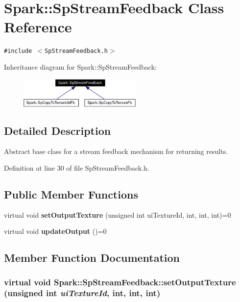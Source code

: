 \section{Spark::Sp\-Stream\-Feedback Class Reference}
\label{classSpark_1_1SpStreamFeedback}
{\tt \#include $<$Sp\-Stream\-Feedback.h$>$}

Inheritance diagram for Spark::Sp\-Stream\-Feedback:\begin{figure}[H]
\begin{center}
\leavevmode
\includegraphics[width=172pt]{classSpark_1_1SpStreamFeedback__inherit__graph}
\end{center}
\end{figure}


\subsection{Detailed Description}
Abstract base class for a stream feedback mechanism for returning results. 

Definition at line 30 of file Sp\-Stream\-Feedback.h.\subsection*{Public Member Functions}
\begin{CompactItemize}
\item 
virtual void {\bf set\-Output\-Texture} (unsigned int ui\-Texture\-Id, int, int, int)=0
\item 
virtual void {\bf update\-Output} ()=0
\end{CompactItemize}


\subsection{Member Function Documentation}
\subsubsection{\setlength{\rightskip}{0pt plus 5cm}virtual void Spark::Sp\-Stream\-Feedback::set\-Output\-Texture (unsigned int {\em ui\-Texture\-Id}, int, int, int)\hspace{0.3cm}{\tt  [pure virtual]}}\label{classSpark_1_1SpStreamFeedback_a0}




